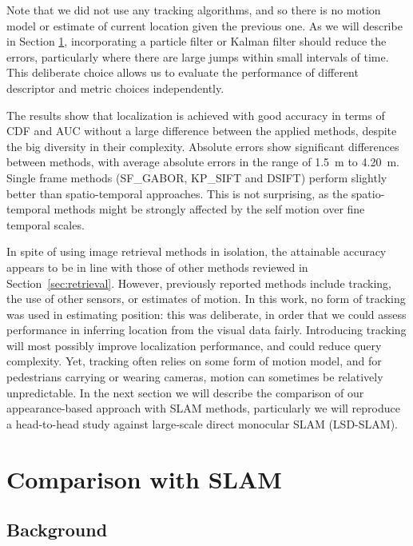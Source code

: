 Note that we did not use any tracking algorithms, and so there is no motion model or estimate of current location given the previous one. As we will describe in Section \ref{sec:slamcomp}, incorporating a particle filter or Kalman filter should reduce the errors, particularly where there are large jumps within small intervals of time. This deliberate choice allows us to evaluate the performance of different descriptor and metric choices independently.

The results show that localization is achieved with good accuracy in terms of CDF and AUC without a large difference between the applied methods, despite the big diversity in their complexity. Absolute errors show significant differences between methods, with average absolute errors in the range of \SI{1.5}{m} to \SI{4.20}{m}. Single frame methods (SF\_GABOR, KP\_SIFT and DSIFT) perform slightly better than spatio-temporal approaches. This is not surprising, as the spatio-temporal methods might be strongly affected by the self motion over fine temporal scales.

In spite of using image retrieval methods in isolation, the attainable accuracy appears to be in line with those of  other methods reviewed in Section~\ref{sec:retrieval}.  However, previously reported methods include tracking, the use of other sensors, or estimates of motion. In this work, no form of tracking was used in estimating position: this was deliberate, in order that we could assess performance in inferring location from the visual data fairly.  Introducing tracking will most possibly improve localization performance, and could reduce query complexity. Yet, tracking often relies on some form of motion model, and for pedestrians carrying or wearing cameras, motion can sometimes be relatively unpredictable. In the next section we will describe the comparison  of our appearance-based approach with SLAM methods, particularly we will reproduce a head-to-head study against large-scale direct monocular SLAM (LSD-SLAM).

\section{Comparison with SLAM}
\label{sec:slamcomp}


\subsection{Background}


